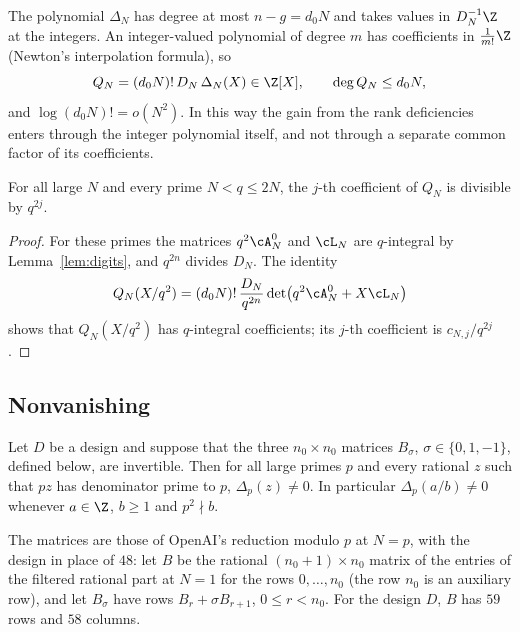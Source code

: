 The polynomial $\Delta_N$ has degree at most $n-g=d_0N$ and takes values in $D_N^{-1}\Z$ at the
integers. An integer-valued polynomial of degree $m$ has coefficients in $\frac1{m!}\Z$ (Newton's
interpolation formula), so
\begin{equation}\label{eq:QN}
 Q_N=(d_0N)!\,D_N\,\Delta_N(X)\in\Z[X],\qquad \deg Q_N\le d_0N,
\end{equation}
and $\log(d_0N)!=o(N^2)$. In this way the gain from the rank deficiencies enters through the integer
polynomial itself, and not through a separate common factor of its coefficients.

\begin{lemma}\label{lem:recycling}
For all large $N$ and every prime $N<q\le2N$, the $j$-th coefficient of $Q_N$ is divisible by $q^{2j}$.
\end{lemma}

\begin{proof}
For these primes the matrices $q^2\cA^0_N$ and $\cL_N$ are $q$-integral by Lemma~\ref{lem:digits}, and
$q^{2n}$ divides $D_N$. The identity
\[
 Q_N(X/q^2)=(d_0N)!\,\frac{D_N}{q^{2n}}\det\bigl(q^2\cA^0_N+X\cL_N\bigr)
\]
shows that $Q_N(X/q^2)$ has $q$-integral coefficients; its $j$-th coefficient is $c_{N,j}/q^{2j}$.
\end{proof}

\subsection{Nonvanishing}
\begin{proposition}\label{prop:nonvanishing}
Let $D$ be a design and suppose that the three $n_0\times n_0$ matrices $B_\sigma$, $\sigma\in\{0,1,-1\}$,
defined below, are invertible. Then for all large primes $p$ and every rational $z$ such that $pz$ has
denominator prime to $p$, $\Delta_p(z)\ne0$. In particular $\Delta_p(a/b)\ne0$ whenever $a\in\Z$, $b\ge1$
and $p^2\nmid b$.
\end{proposition}

The matrices are those of OpenAI's reduction modulo $p$ at $N=p$, with the design in place of $48$: let
$B$ be the rational $(n_0+1)\times n_0$ matrix of the entries of the filtered rational part at $N=1$ for
the rows $0,\dots,n_0$ (the row $n_0$ is an auxiliary row), and let $B_\sigma$ have rows
$B_r+\sigma B_{r+1}$, $0\le r<n_0$. For the design $D$, $B$ has $59$ rows and $58$ columns.


